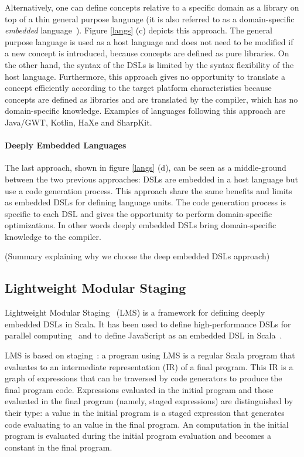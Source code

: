 \documentclass[preprint]{sigplanconf}
\begin{document}
Alternatively, one can define concepts relative to a specific domain as a library on top of a thin general purpose
language (it is also referred to as a domain-specific \emph{embedded} language~\cite{Hudak96_DSEL}). Figure
\ref{langs} (c) depicts this approach. The general purpose language is used as a host language and does not need to
be modified if a new concept is introduced, because concepts are defined as pure libraries. On the other hand, the
syntax of the DSLs is limited by the syntax flexibility of the host language. Furthermore, this approach gives no
opportunity to translate a concept efficiently according to the target platform characteristics because concepts are
defined as libraries and are translated by the compiler, which has no domain-specific knowledge. Examples of
languages following this approach are Java/GWT, Kotlin, HaXe and SharpKit.

\paragraph{Deeply Embedded Languages}

The last approach, shown in figure \ref{langs} (d), can be seen as a middle-ground between the two previous
approaches: DSLs are embedded in a host language but use a code generation process. This approach share the same
benefits and limits as embedded DSLs for defining language units. The code generation process is specific to each DSL
and gives the opportunity to perform domain-specific optimizations. In other words deeply embedded DSLs bring
domain-specific knowledge to the compiler.

(Summary explaining why we choose the deep embedded DSLs approach)

\subsection{Lightweight Modular Staging}

Lightweight Modular Staging~\cite{Rompf12_LMSThesis, Rompf12_LMS} (LMS) is a framework for defining deeply embedded
DSLs in Scala. It has been used to define high-performance DSLs for parallel computing~\cite{Brown11_Parallel} and to
define JavaScript as an embedded DSL in Scala~\cite{Kossakowski12_JsDESL}.

LMS is based on staging~\cite{Jorring1986_Staging}: a program using LMS is a regular Scala program that evaluates
to an intermediate representation (IR) of a final program. This IR is a graph of expressions that can be traversed
by code generators to produce the final program code. Expressions evaluated in the initial program and those
evaluated in the final program (namely, staged expressions) are distinguished by their type: a  value
in the initial program is a staged expression that generates code evaluating to an  value in the final
program. An  computation in the initial program is evaluated during the initial program evaluation and
becomes a constant in the final program.
\end{document}
